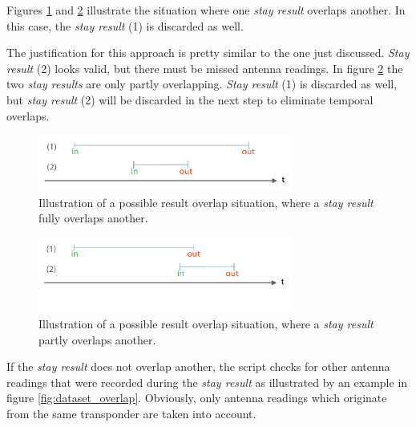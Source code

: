 Figures \ref{fig:result_overlap_single} and \ref{fig:result_overlap_single_shifted} illustrate the situation where one \textit{stay result} overlaps another. In this case, the \textit{stay result} (1) is discarded as well.

The justification for this approach is pretty similar to the one just discussed. \textit{Stay result} (2) looks valid, but there must be missed antenna readings. In figure \ref{fig:result_overlap_single_shifted} the two \textit{stay results} are only partly overlapping. \textit{Stay result} (1) is discarded as well, but \textit{stay result} (2) will be discarded in the next step to eliminate temporal overlaps.      

\begin{figure}[htpb]
\begin{center}
  \includegraphics[width=0.75\textwidth]{assets/pdf/result_overlaps_single_schema.pdf}
  \caption[Single result full overlap situation]{Illustration of a possible result overlap situation, where a \textit{stay result} fully overlaps another.}
  \label{fig:result_overlap_single}
\end{center}
\end{figure} 

\begin{figure}[htpb]
\begin{center}
  \includegraphics[width=0.75\textwidth]{assets/pdf/result_overlaps_single_shifted_schema.pdf}
  \caption[Single result partly overlap situation]{Illustration of a possible result overlap situation, where a \textit{stay result} partly overlaps another.}
  \label{fig:result_overlap_single_shifted}
\end{center}
\end{figure}

If the \textit{stay result} does not overlap another, the script checks for other antenna readings that were recorded during the \textit{stay result} as illustrated by an example in figure \ref{fig:dataset_overlap}. Obviously, only antenna readings which originate from the same transponder are taken into account.

